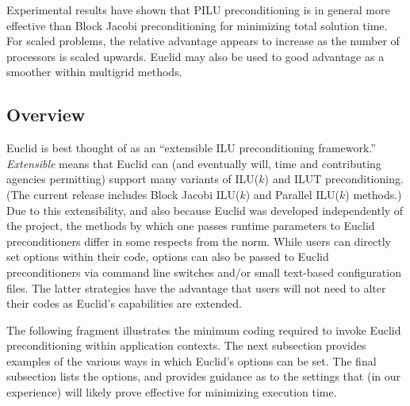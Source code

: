 Experimental results have shown that PILU preconditioning is in general
more effective than Block Jacobi preconditioning 
for minimizing total solution time.
For scaled problems, the relative advantage appears to increase 
as the number of processors is scaled upwards.
Euclid may also be used to good advantage as a smoother within 
multigrid methods.


\subsection{Overview}

Euclid is best thought of as an ``extensible ILU preconditioning
framework.''
{\em Extensible} means that Euclid can (and eventually will, time and
contributing agencies permitting) support many variants of ILU($k$)
and ILUT preconditioning.
(The current release includes Block Jacobi ILU($k$) and
Parallel ILU($k$) methods.)
Due to this extensibility, and also because Euclid was developed 
independently of the \hypre{} project, the methods by which one
passes runtime parameters to Euclid preconditioners
differ in some respects from the \hypre{} norm.
While users can directly set options within their code,
options can also be passed to Euclid preconditioners via
command line switches and/or small text-based configuration files.
The latter strategies have the advantage that users will not need to
alter their codes as Euclid's capabilities are extended.


The following fragment illustrates the minimum coding %
required to invoke Euclid preconditioning within \hypre{} application contexts.
The next subsection provides examples of the various ways in which
Euclid's options can be set. 
The final subsection lists the options,
and provides guidance as to the settings that (in our experience) 
will likely prove effective for minimizing execution time.

